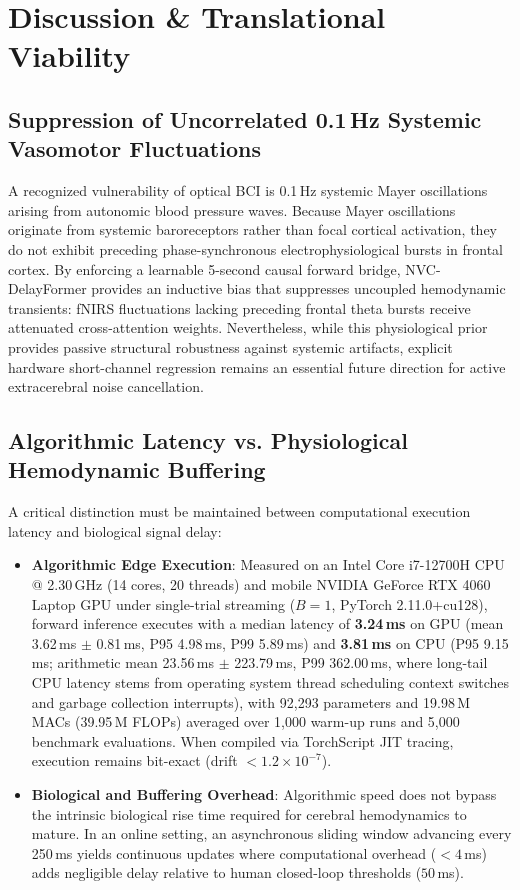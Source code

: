 \documentclass[journal]{IEEEtran}
\begin{document}
\section{Discussion \& Translational Viability}

\subsection{Suppression of Uncorrelated \texorpdfstring{0.1\,Hz}{0.1 Hz} Systemic Vasomotor Fluctuations}
A recognized vulnerability of optical BCI is 0.1\,Hz systemic Mayer oscillations arising from autonomic blood pressure waves. Because Mayer oscillations originate from systemic baroreceptors rather than focal cortical activation, they do not exhibit preceding phase-synchronous electrophysiological bursts in frontal cortex. By enforcing a learnable 5-second causal forward bridge, NVC-DelayFormer provides an inductive bias that suppresses uncoupled hemodynamic transients: fNIRS fluctuations lacking preceding frontal theta bursts receive attenuated cross-attention weights. Nevertheless, while this physiological prior provides passive structural robustness against systemic artifacts, explicit hardware short-channel regression remains an essential future direction for active extracerebral noise cancellation.

\subsection{Algorithmic Latency vs. Physiological Hemodynamic Buffering}
A critical distinction must be maintained between computational execution latency and biological signal delay:
\begin{itemize}
    \item \textbf{Algorithmic Edge Execution}: Measured on an Intel Core i7-12700H CPU @ 2.30\,GHz (14 cores, 20 threads) and mobile NVIDIA GeForce RTX 4060 Laptop GPU under single-trial streaming ($B=1$, PyTorch 2.11.0+cu128), forward inference executes with a median latency of \textbf{3.24\,ms} on GPU (mean 3.62\,ms $\pm$ 0.81\,ms, P95 4.98\,ms, P99 5.89\,ms) and \textbf{3.81\,ms} on CPU (P95 9.15\,ms; arithmetic mean 23.56\,ms $\pm$ 223.79\,ms, P99 362.00\,ms, where long-tail CPU latency stems from operating system thread scheduling context switches and garbage collection interrupts), with 92,293 parameters and 19.98\,M MACs (39.95\,M FLOPs) averaged over 1,000 warm-up runs and 5,000 benchmark evaluations. When compiled via TorchScript JIT tracing, execution remains bit-exact (drift $< 1.2 \times 10^{-7}$).
    \item \textbf{Biological and Buffering Overhead}: Algorithmic speed does not bypass the intrinsic biological rise time required for cerebral hemodynamics to mature. In an online setting, an asynchronous sliding window advancing every 250\,ms yields continuous updates where computational overhead ($<4$\,ms) adds negligible delay relative to human closed-loop thresholds ($50$\,ms).
\end{itemize}
\end{document}
